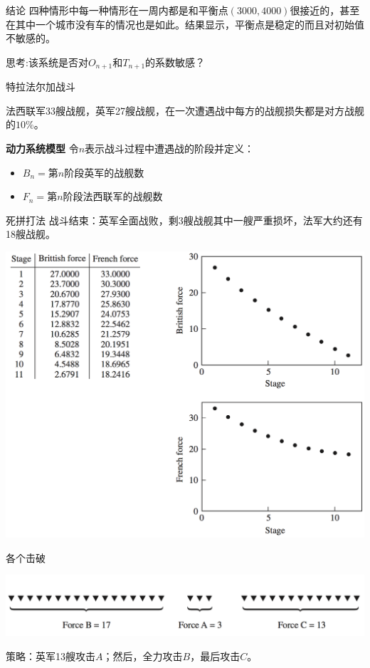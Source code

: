 \documentclass[UTF8, mathserif]{ctexbeamer}
\begin{document}
\begin{frame}{结论}
  四种情形中每一种情形在一周内都是和平衡点$(3000,4000)$很接近的，甚至在其中一个城市没有车的情况也是如此。结果显示，平衡点是稳定的而且对初始值不敏感的。

  思考:该系统是否对$O_{n+1}$和$T_{n+1}$的系数敏感？

\end{frame}

\begin{frame}{特拉法尔加战斗}

  法西联军33艘战舰，英军27艘战舰，在一次遭遇战中每方的战舰损失都是对方战舰的$10\%$。

  {\bf{}动力系统模型} 令$n$表示战斗过程中遭遇战的阶段并定义：

  \begin{definition}
    \begin{itemize}
    \item $B_n = $第$n$阶段英军的战舰数
    \item $F_n = $第$n$阶段法西联军的战舰数
    \end{itemize}
  \end{definition}

\end{frame}

\begin{frame}{死拼打法}
  战斗结束：英军全面战败，剩3艘战舰其中一艘严重损坏，法军大约还有18艘战舰。
  \begin{center}
    \includegraphics[width=.6\textwidth{}]{fight-death.png}
  \end{center}
\end{frame}

\begin{frame}{各个击破}
  \begin{center}
    \includegraphics[width=.6\textwidth{}]{fight-france.png}
  \end{center}
  
  策略：英军13艘攻击$A$；然后，全力攻击$B$，最后攻击$C$。
  
\end{frame}
\end{document}
